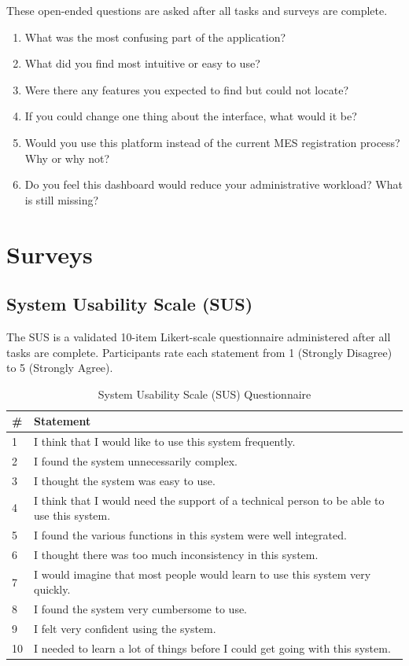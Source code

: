 \documentclass[12pt, titlepage]{article}
\begin{document}
These open-ended questions are asked after all tasks and surveys are complete.


\begin{enumerate}
    \item What was the most confusing part of the application?
    \item What did you find most intuitive or easy to use?
    \item Were there any features you expected to find but could not locate?
    \item If you could change one thing about the interface, what would it be?
    \item Would you use this platform instead of the current MES registration process? Why or why not?
    \item [Organizers only] Do you feel this dashboard would reduce your administrative workload? What is still missing?
\end{enumerate}


\section{Surveys}


\subsection{System Usability Scale (SUS)}


The SUS is a validated 10-item Likert-scale questionnaire administered after all tasks are complete. Participants rate each statement from 1 (Strongly Disagree) to 5 (Strongly Agree).


\begin{table}[H]
\centering
\caption{System Usability Scale (SUS) Questionnaire}
\begin{tabularx}{\textwidth}{p{0.5cm}X}
\toprule
\textbf{\#} & \textbf{Statement} \\
\midrule
1 & I think that I would like to use this system frequently. \\
2 & I found the system unnecessarily complex. \\
3 & I thought the system was easy to use. \\
4 & I think that I would need the support of a technical person to be able to use this system. \\
5 & I found the various functions in this system were well integrated. \\
6 & I thought there was too much inconsistency in this system. \\
7 & I would imagine that most people would learn to use this system very quickly. \\
8 & I found the system very cumbersome to use. \\
9 & I felt very confident using the system. \\
10 & I needed to learn a lot of things before I could get going with this system. \\
\bottomrule
\end{tabularx}
\end{table}
\end{document}
